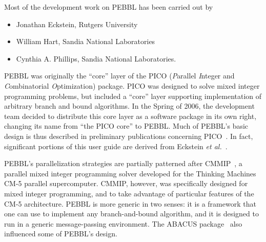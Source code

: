 Most of the development work on PEBBL has been carried out by
\begin{itemize}
\item Jonathan Eckstein, Rutgers University
\item William Hart, Sandia National Laboratories
\item Cynthia A. Phillips, Sandia National Laboratories.
\end{itemize}
PEBBL was originally the ``core''
layer of the PICO (\emph{P}arallel \emph{I}nteger and
\emph{C}ombina\-torial \emph{O}ptimization) package.  PICO was designed
to solve mixed integer programming problems, but included a ``core''
layer supporting implementation of arbitrary branch and bound
algorithms.  In the Spring of 2006, the development team decided to
distribute this core layer as a software package in its own right,
changing its name from ``the PICO core'' to PEBBL.  Much of PEBBL's
basic design is thus described in preliminary
publications concerning PICO~\cite{EHP97,EPH00,EPH00a}.  In fact,
significant portions of this user guide are derived
from Eckstein \emph{et al.}~\cite{EPH00a,EPH00}.

PEBBL's parallelization strategies are partially patterned after
CMMIP~\cite{Eck94,Eck97}, a parallel mixed integer programming solver
developed for the Thinking Machines CM-5 parallel supercomputer.
CMMIP, however, was specifically designed for mixed integer
programming, and to take advantage of particular features of the CM-5
architecture.  PEBBL is more generic in two senses: it is a framework that
one can use to implement any branch-and-bound algorithm, and it is
designed to run in a generic message-passing environment.  The ABACUS
package~\cite{JT98} also influenced some of PEBBL's design.
